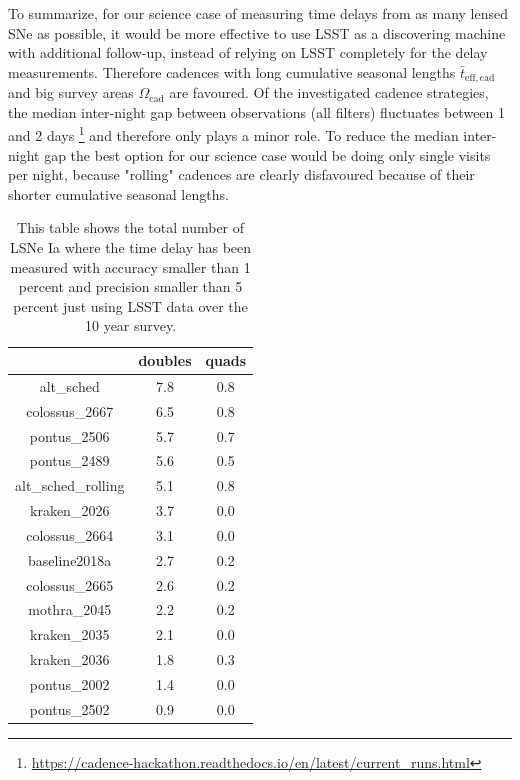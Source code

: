 To summarize, for our science case of measuring time delays from as many lensed SNe as possible, it would be more effective to use LSST as
 a discovering machine with additional follow-up, instead of relying on LSST completely for the delay measurements. Therefore cadences with long cumulative seasonal lengths $\bar{t}_\mathrm{eff,cad}$ and big survey areas
 $\Omega_\mathrm{cad}$ are favoured. Of the investigated cadence strategies, the median inter-night gap 
 between observations (all filters) fluctuates between
 1 and 2 days \footnote{\url{https://cadence-hackathon.readthedocs.io/en/latest/current_runs.html}} and
 therefore only plays a minor role. To reduce the median inter-night gap the best option for our science case would be doing only single visits per night, because "rolling" cadences are clearly disfavoured because of their shorter cumulative seasonal lengths.
%
\begin{table}
\centering
\begin{tabular}{c|c|c}
& doubles & quads \\
\hline
alt\_sched & 7.8 & 0.8 \\
\hline
colossus\_2667 & 6.5 &0.8 \\
\hline
pontus\_2506 & 5.7 & 0.7 \\
\hline
pontus\_2489 & 5.6 &0.5 \\
\hline
alt\_sched\_rolling & 5.1 &0.8 \\
\hline
kraken\_2026 & 3.7 &0.0 \\
\hline
colossus\_2664 & 3.1 &0.0 \\
\hline
baseline2018a & 2.7 &0.2  \\
\hline
colossus\_2665 & 2.6 &0.2 \\
\hline
mothra\_2045 &2.2 &0.2  \\
\hline
kraken\_2035 & 2.1 &0.0  \\
\hline
kraken\_2036 & 1.8 &0.3 \\
\hline
pontus\_2002 & 1.4 &0.0 \\
\hline
pontus\_2502 & 0.9 &0.0 \\
\end{tabular}
\caption{This table shows the total number of LSNe Ia where the time
  delay has been measured with accuracy smaller than 1 percent and
  precision smaller than 5 percent just using LSST data over the 10
  year survey. }
\label{tab: total number accuracy less 1 precision less 5 percent}
\end{table}
%
